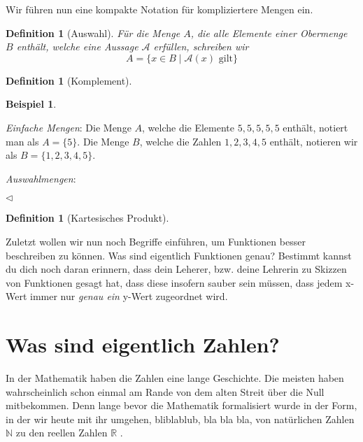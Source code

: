 \documentclass[11pt,reqno, a4paper]{book}
\theoremstyle{mystyle}
\newtheorem{definition}[theorem]{Definition}
\theoremstyle{definition}
\newtheorem{exampleth}[theorem]{Beispiel}
\newenvironment{example}{\begin{exampleth}}{\hspace{\fill}$\triangleleft$\end{exampleth}}
\numberwithin{equation}{chapter}
\begin{document}
Wir führen nun eine kompakte Notation für kompliziertere Mengen ein. 
\begin{definition}[Auswahl]
    Für die Menge \(A\), die alle Elemente einer Obermenge \(B\) enthält, welche eine Aussage \(\mathscr A\) erfüllen, schreiben wir 
    \begin{equation*}
        A = \{x \in B \mid \mathscr A(x) \text{ gilt}\}
    \end{equation*}
\end{definition}


\begin{definition}[Komplement]
    
\end{definition}

\begin{example}
    \begin{thmenum}
        \item \textit{Einfache Mengen}: Die Menge \(A\), welche die Elemente \(5, 5, 5, 5, 5\) enthält, notiert man als \(A = \{5\}\). Die Menge \(B\), welche die Zahlen \(1, 2, 3, 4, 5\) enthält, notieren wir als \(B = \{1, 2, 3, 4, 5\}\). 

        \item \textit{Auswahlmengen}:
    \end{thmenum}
\end{example}

\begin{definition}[Kartesisches Produkt]
    
\end{definition}

Zuletzt wollen wir nun noch Begriffe einführen, um Funktionen besser beschreiben zu können. Was sind eigentlich Funktionen genau? Bestimmt kannst du dich noch daran erinnern, dass dein Leherer, bzw. deine Lehrerin zu Skizzen von Funktionen gesagt hat, dass diese insofern sauber sein müssen, dass jedem x-Wert immer nur \textit{genau ein} y-Wert zugeordnet wird. 

\section{Was sind eigentlich Zahlen?} \label{sec:was-sind-eig-zahlen}
In der Mathematik haben die Zahlen eine lange Geschichte. Die meisten haben wahrscheinlich schon einmal am Rande von dem alten Streit über die Null mitbekommen. Denn lange bevor die Mathematik formalisiert wurde in der Form, in der wir heute mit ihr umgehen, bliblablub, bla bla bla, von natürlichen Zahlen \(\mathbb N\)  zu den reellen Zahlen \(\mathbb R\) .
\end{document}
